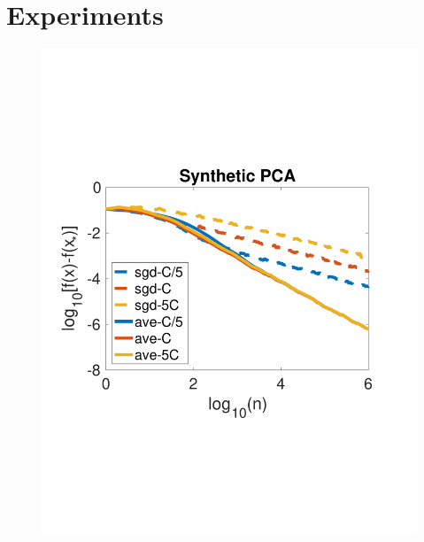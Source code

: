  \section{Experiments} \label{sec:experiments}
 \vspace{-4pt}

 \begin{figure}[!t]
 \vspace{-2.3cm}
\centering
\begin{minipage}[c]{.45\linewidth}
\includegraphics[width=\linewidth]{Figs/dftcc}
   \end{minipage}
   \hspace*{-10pt}
   \begin{minipage}[c]{.45\linewidth}

\end{minipage}
\end{figure}
